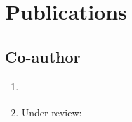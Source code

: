 \section*{Publications}

\subsection*{Co-author}
\begin{enumerate}
\item \citet{geoopt}
\item Under review: \citet{denoisingAkhmedkhan}
\end{enumerate}
